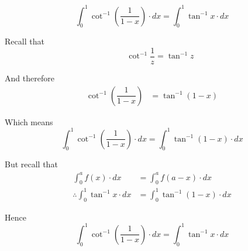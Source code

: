 \documentclass[14pt,fleqn]{extarticle}
\begin{document}
\[\int_0^1\cot^{-1}\left(\dfrac{1}{1-x} \right)\cdot dx = \int_0^1\tan^{-1} x\cdot dx \]
\newcard 

Recall that 
\[ \qquad \cot^{-1}\dfrac{1}{z} = \tan^{-1} z \]

And therefore 
\begin{align}
	\cot^{-1} \left(\dfrac{1}{1-x} \right) &= \tan^{-1} \left(1-x \right)
\end{align} 

Which means 
	\[ \int_0^1 \cot^{-1}\left(\dfrac{1}{1-x} \right)\cdot dx =\int_0^1\tan^{-1}(1-x)\cdot dx  \]
	
But recall that 
\begin{align} 
	\int_0^a f(x)\cdot dx &= \int_0^a f(a-x)\cdot dx  \\[-10pt]
	\therefore\int_0^1\tan^{-1} x\cdot dx &= \int_0^1 \tan^{-1} \left(1-x \right)\cdot dx
\end{align}

Hence 
\[ \int_0^1\cot^{-1}\left(\dfrac{1}{1-x} \right)\cdot dx = \int_0^1\tan^{-1} x\cdot dx\]
\end{document}
